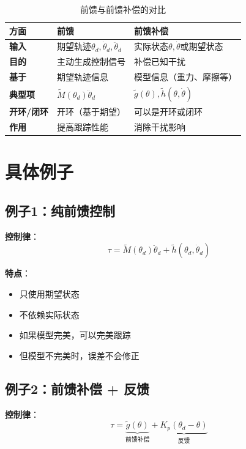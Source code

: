 \documentclass[12pt,a4paper]{article}
\begin{document}
\begin{table}[h]
\centering
\begin{tabular}{|l|l|l|}
\hline
\textbf{方面} & \textbf{前馈} & \textbf{前馈补偿} \\
\hline
\textbf{输入} & 期望轨迹$\theta_d, \dot{\theta}_d, \ddot{\theta}_d$ & 实际状态$\theta, \dot{\theta}$或期望状态 \\
\hline
\textbf{目的} & 主动生成控制信号 & 补偿已知干扰 \\
\hline
\textbf{基于} & 期望轨迹信息 & 模型信息（重力、摩擦等） \\
\hline
\textbf{典型项} & $\tilde{M}(\theta_d)\ddot{\theta}_d$ & $\tilde{g}(\theta), \tilde{h}(\theta, \dot{\theta})$ \\
\hline
\textbf{开环/闭环} & 开环（基于期望） & 可以是开环或闭环 \\
\hline
\textbf{作用} & 提高跟踪性能 & 消除干扰影响 \\
\hline
\end{tabular}
\caption{前馈与前馈补偿的对比}
\end{table}

\section{具体例子}

\subsection{例子1：纯前馈控制}

\textbf{控制律}：
\begin{equation}
\tau = \tilde{M}(\theta_d)\ddot{\theta}_d + \tilde{h}(\theta_d, \dot{\theta}_d)
\end{equation}

\textbf{特点}：
\begin{itemize}
\item 只使用期望状态
\item 不依赖实际状态
\item 如果模型完美，可以完美跟踪
\item 但模型不完美时，误差不会修正
\end{itemize}

\subsection{例子2：前馈补偿 + 反馈}

\textbf{控制律}：
\begin{equation}
\tau = \underbrace{\tilde{g}(\theta)}_{\text{前馈补偿}} + \underbrace{K_p(\theta_d - \theta)}_{\text{反馈}}
\end{equation}
\end{document}
